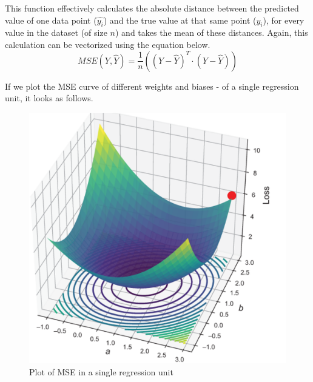 \documentclass{article}
\begin{document}
    This function effectively calculates the absolute distance between the predicted value of one data point ($\hat{y_i}$) and the true value at that same point ($y_i$),
    for every value in the dataset (of size $n$) and takes the mean of these distances.
    Again, this calculation can be vectorized using the equation below.
    \begin{displaymath}
        MSE(Y, \hat{Y}) = \frac{1}{n}((Y - \hat{Y})^T \cdot (Y - \hat{Y}))
    \end{displaymath}

    \pagebreak
    If we plot the MSE curve of different weights and biases - of a single regression unit, it looks as follows.
    \begin{figure}[h]
        \centering
        \includegraphics[scale=0.5]{MSEplot.png}
        \caption{Plot of MSE in a single regression unit}
    \end{figure}
\end{document}
